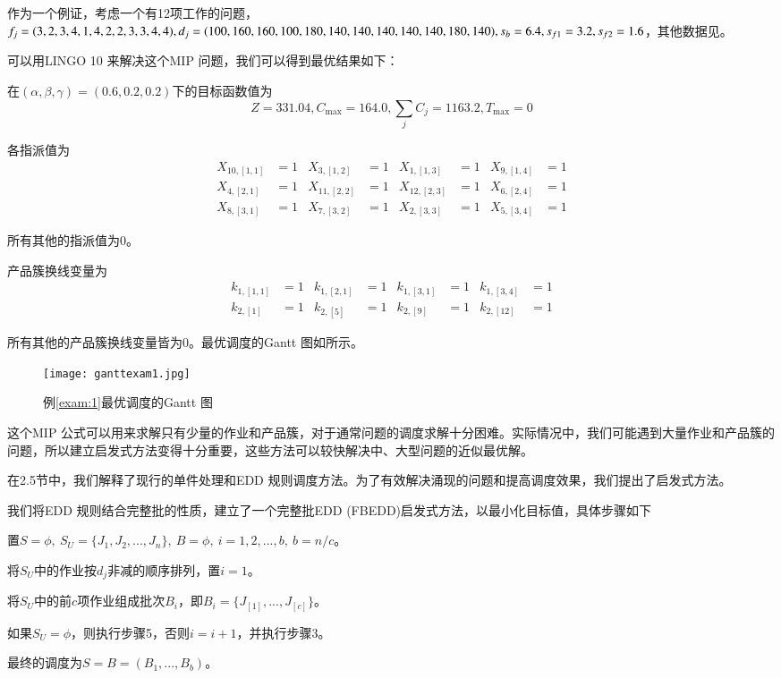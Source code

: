 \begin{example}
作为一个例证，考虑一个有12项工作的问题，$f_j=(3,2,3,4,1,4,2,2,3,3,4,4),d_j=(100,160,160,100,\\
180,140,140,140,140,140,180,140),s_b=6.4,s_{f1}=3.2,s_{f2}=1.6$，其他数据见。\label{exam:1}
\end{example}

可以用LINGO 10 来解决这个MIP 问题，我们可以得到最优结果如下：

在$(\alpha,\beta,\gamma) = (0.6,0.2,0.2)$下的目标函数值为
$$Z = 331.04, C_{\max} = 164.0, {\textstyle\sum_j C_j = 1163.2}, T_{\max} = 0$$

各指派值为
\begin{align*}
 X_{10,[1,1]} & = 1 & X_{3,[1,2]} & = 1 & X_{1,[1,3]} & = 1 & X_{9,[1,4]} & = 1\\
 X_{4,[2,1]} & = 1 & X_{11,[2,2]} & = 1 & X_{12,[2,3]} & = 1 & X_{6,[2,4]} & = 1\\
 X_{8,[3,1]} & = 1 & X_{7,[3,2]} & = 1 & X_{2,[3,3]} & = 1 & X_{5,[3,4]} & = 1
\end{align*}

所有其他的指派值为0。

产品簇换线变量为
\begin{align*}
k_{1,[1,1]} & = 1 & k_{1,[2,1]} & = 1 & k_{1,[3,1]} & = 1 & k_{1,[3,4]} & = 1 \\
k_{2,[1]} & = 1 & k_{2,[5]} & = 1 & k_{2,[9]} & = 1 & k_{2,[12]} & = 1
\end{align*}

所有其他的产品簇换线变量皆为0。最优调度的Gantt 图如所示。
\begin{figure}[h]
\texttt{[image: ganttexam1.jpg]}
\caption{例\ref{exam:1}最优调度的Gantt 图\label{fig:gantt1}}
\end{figure}

这个MIP 公式可以用来求解只有少量的作业和产品簇，对于通常问题的调度求解十分困难。实际情况中，我们可能遇到大量作业和产品簇的问题，所以建立启发式方法变得十分重要，这些方法可以较快解决中、大型问题的近似最优解。

在2.5节中，我们解释了现行的单件处理和EDD 规则调度方法。为了有效解决涌现的问题和提高调度效果，我们提出了启发式方法。
\newcommand{\Step}{{\heiti 步骤}}

我们将EDD 规则结合完整批的性质，建立了一个完整批EDD (FBEDD)启发式方法，以最小化目标值，具体步骤如下

\begin{asparaenum}
\renewcommand{\labelenumi}{\heiti 步骤\theenumi~}
\item 置$S=\phi,\ S_U = \{J_1,J_2,...,J_n\},\ B=\phi,\ i=1,2,...,b,\ b = n/c$。
\item 将$S_U$中的作业按$d_j$非减的顺序排列，置$i=1$。
\item 将$S_U$中的前$c$项作业组成批次$B_i$，即$B_i = \{J_{[1]},...,J_{[c]}\}$。
\item 如果$S_U = \phi$，则执行\Step5，否则$i=i+1$，并执行\Step 3。
\item 最终的调度为$S=B=(B_1,...,B_b)$。
\end{asparaenum}

